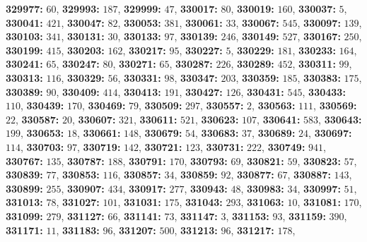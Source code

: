 \textsf{\bfseries 329977:} $60$, \textsf{\bfseries 329993:} $187$, \textsf{\bfseries 329999:} $47$, \textsf{\bfseries 330017:} $80$, \textsf{\bfseries 330019:} $160$, \textsf{\bfseries 330037:} $5$, \textsf{\bfseries 330041:} $421$, \textsf{\bfseries 330047:} $82$, \textsf{\bfseries 330053:} $381$, \textsf{\bfseries 330061:} $33$, \textsf{\bfseries 330067:} $545$, \textsf{\bfseries 330097:} $139$, \textsf{\bfseries 330103:} $341$, \textsf{\bfseries 330131:} $30$, \textsf{\bfseries 330133:} $97$, \textsf{\bfseries 330139:} $246$, \textsf{\bfseries 330149:} $527$, \textsf{\bfseries 330167:} $250$, \textsf{\bfseries 330199:} $415$, \textsf{\bfseries 330203:} $162$, \textsf{\bfseries 330217:} $95$, \textsf{\bfseries 330227:} $5$, \textsf{\bfseries 330229:} $181$, \textsf{\bfseries 330233:} $164$, \textsf{\bfseries 330241:} $65$, \textsf{\bfseries 330247:} $80$, \textsf{\bfseries 330271:} $65$, \textsf{\bfseries 330287:} $226$, \textsf{\bfseries 330289:} $452$, \textsf{\bfseries 330311:} $99$, \textsf{\bfseries 330313:} $116$, \textsf{\bfseries 330329:} $56$, \textsf{\bfseries 330331:} $98$, \textsf{\bfseries 330347:} $203$, \textsf{\bfseries 330359:} $185$, \textsf{\bfseries 330383:} $175$, \textsf{\bfseries 330389:} $90$, \textsf{\bfseries 330409:} $414$, \textsf{\bfseries 330413:} $191$, \textsf{\bfseries 330427:} $126$, \textsf{\bfseries 330431:} $545$, \textsf{\bfseries 330433:} $110$, \textsf{\bfseries 330439:} $170$, \textsf{\bfseries 330469:} $79$, \textsf{\bfseries 330509:} $297$, \textsf{\bfseries 330557:} $2$, \textsf{\bfseries 330563:} $111$, \textsf{\bfseries 330569:} $22$, \textsf{\bfseries 330587:} $20$, \textsf{\bfseries 330607:} $321$, \textsf{\bfseries 330611:} $521$, \textsf{\bfseries 330623:} $107$, \textsf{\bfseries 330641:} $583$, \textsf{\bfseries 330643:} $199$, \textsf{\bfseries 330653:} $18$, \textsf{\bfseries 330661:} $148$, \textsf{\bfseries 330679:} $54$, \textsf{\bfseries 330683:} $37$, \textsf{\bfseries 330689:} $24$, \textsf{\bfseries 330697:} $114$, \textsf{\bfseries 330703:} $97$, \textsf{\bfseries 330719:} $142$, \textsf{\bfseries 330721:} $123$, \textsf{\bfseries 330731:} $222$, \textsf{\bfseries 330749:} $941$, \textsf{\bfseries 330767:} $135$, \textsf{\bfseries 330787:} $188$, \textsf{\bfseries 330791:} $170$, \textsf{\bfseries 330793:} $69$, \textsf{\bfseries 330821:} $59$, \textsf{\bfseries 330823:} $57$, \textsf{\bfseries 330839:} $77$, \textsf{\bfseries 330853:} $116$, \textsf{\bfseries 330857:} $34$, \textsf{\bfseries 330859:} $92$, \textsf{\bfseries 330877:} $67$, \textsf{\bfseries 330887:} $143$, \textsf{\bfseries 330899:} $255$, \textsf{\bfseries 330907:} $434$, \textsf{\bfseries 330917:} $277$, \textsf{\bfseries 330943:} $48$, \textsf{\bfseries 330983:} $34$, \textsf{\bfseries 330997:} $51$, \textsf{\bfseries 331013:} $78$, \textsf{\bfseries 331027:} $101$, \textsf{\bfseries 331031:} $175$, \textsf{\bfseries 331043:} $293$, \textsf{\bfseries 331063:} $10$, \textsf{\bfseries 331081:} $170$, \textsf{\bfseries 331099:} $279$, \textsf{\bfseries 331127:} $66$, \textsf{\bfseries 331141:} $73$, \textsf{\bfseries 331147:} $3$, \textsf{\bfseries 331153:} $93$, \textsf{\bfseries 331159:} $390$, \textsf{\bfseries 331171:} $11$, \textsf{\bfseries 331183:} $96$, \textsf{\bfseries 331207:} $500$, \textsf{\bfseries 331213:} $96$, \textsf{\bfseries 331217:} $178$, 
